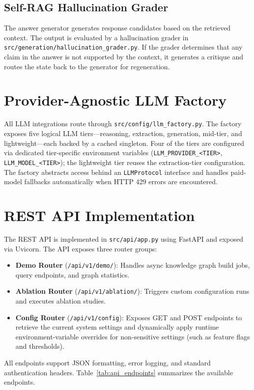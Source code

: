 \subsection{Self-RAG Hallucination Grader}
\label{sec:imp:hallucination_grader}

The answer generator generates response candidates based on the retrieved context. The output is evaluated by a hallucination grader in \texttt{src/generation/hallucination\_grader.py}. If the grader determines that any claim in the answer is not supported by the context, it generates a critique and routes the state back to the generator for regeneration.

\section{Provider-Agnostic LLM Factory}
\label{sec:imp:llm_factory}

All LLM integrations route through \texttt{src/config/llm\_factory.py}. The factory exposes five logical LLM tiers---reasoning, extraction, generation, mid-tier, and lightweight---each backed by a cached singleton. Four of the tiers are configured via dedicated tier-specific environment variables (\texttt{LLM\_PROVIDER\_\textless{}TIER\textgreater{}}, \texttt{LLM\_MODEL\_\textless{}TIER\textgreater{}}); the lightweight tier reuses the extraction-tier configuration. The factory abstracts access behind an \texttt{LLMProtocol} interface and handles paid-model fallbacks automatically when HTTP 429 errors are encountered.

\section{REST API Implementation}
\label{sec:imp:api}

The REST API is implemented in \texttt{src/api/app.py} using FastAPI and exposed via Uvicorn. The API exposes three router groups:
\begin{itemize}
    \item \textbf{Demo Router} (\texttt{/api/v1/demo/}): Handles async knowledge graph build jobs, query endpoints, and graph statistics.
    \item \textbf{Ablation Router} (\texttt{/api/v1/ablation/}): Triggers custom configuration runs and executes ablation studies.
    \item \textbf{Config Router} (\texttt{/api/v1/config}): Exposes GET and POST endpoints to retrieve the current system settings and dynamically apply runtime environment-variable overrides for non-sensitive settings (such as feature flags and thresholds).
\end{itemize}
All endpoints support JSON formatting, error logging, and standard authentication headers. Table~\ref{tab:api_endpoints} summarizes the available endpoints.

